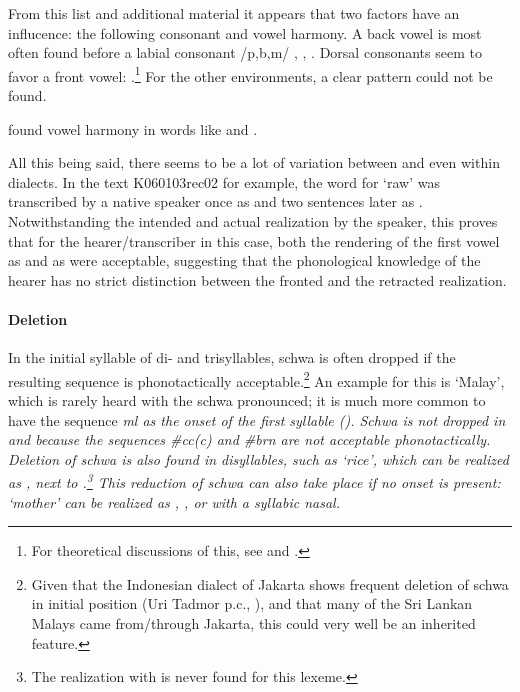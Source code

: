 From this list and additional material it appears that two factors have an influcence: the following consonant and vowel harmony. A back vowel is most often found before a labial consonant /p,b,m/
,
,
 \citep[cf. ][27]{Adelaar1991}. Dorsal consonants seem to favor a front vowel:
.\footnote{For theoretical discussions of this, see \citet{Clements1990sonority} and \citet[99]{Botma2004}.}
For the other environments, a clear pattern could not be found.

\citet{Bichsel} found vowel harmony in words like  and  \citep[also cf.][27]{Adelaar1991}.

All this being said, there seems to be a lot of variation between and even within dialects. In the text K060103rec02 for example, the word for `raw' was transcribed by a native speaker once as  and two sentences later as . Notwithstanding the intended and actual realization by the speaker, this proves that for the hearer/transcriber in this case, both the rendering of the first vowel as  and as  were acceptable, suggesting that the phonological knowledge of the hearer has no strict distinction between the fronted and the retracted realization.



\paragraph{Deletion}\label{sec:phon:schwa:deletion}
In the initial syllable of di- and trisyllables, schwa is often dropped if the resulting sequence is phonotactically acceptable.\footnote{Given that the Indonesian dialect of Jakarta shows frequent deletion of schwa in initial position (Uri Tadmor p.c., \citep[229]{Ewing2005}), and that many of the Sri Lankan Malays came from/through Jakarta, this could very well be an inherited feature.} An example for this is  `Malay', which is rarely heard with the schwa pronounced; it is much more common to have the sequence \em ml \em as the onset of the first syllable (). Schwa is not dropped in  and  because the sequences \em \#cc(c\textipa{:}) \em and \em \#brn \em are not acceptable phonotactically. Deletion of schwa is also found in disyllables,  such as `rice', which can be realized as , next to .\footnote{The realization with  is never found for this lexeme.} This reduction of schwa can also take place if no onset is present: `mother' can be realized as , , or   with a syllabic nasal.

